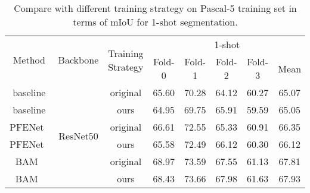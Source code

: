 \documentclass{article}
\begin{document}
\begin{table}[h]\scriptsize
\centering
\setlength\tabcolsep{4pt}
\renewcommand\arraystretch{1.3}
\caption{Compare with different training strategy on Pascal-5 training set in terms of mIoU for 1-shot segmentation.}
\label{tab:strategy}
\begin{tabular}{c|c|c|ccccc}
\hline
\multirow{2}{*}{Method} & \multirow{2}{*}{Backbone} & \multirow{2}{*}{Training Strategy} & \multicolumn{5}{c}{1-shot}                                    \\ \cline{4-8} 
                        &                           &                                    & Fold-0 & Fold-1 & Fold-2 & \multicolumn{1}{c|}{Fold-3} & Mean  \\ \hline
baseline                & \multirow{6}{*}{ResNet50} & original                           & 65.60  & 70.28  & 64.12  & \multicolumn{1}{c|}{60.27}  & 65.07 \\
baseline                &                           & ours                               & 64.95  & 69.75  & 65.91  & \multicolumn{1}{c|}{59.59}  & 65.05 \\ \cline{1-1} \cline{3-8} 
PFENet~\cite{tian2020prior}                  &                           & original                           & 66.61  & 72.55  & 65.33  & \multicolumn{1}{c|}{60.91}  & 66.35 \\
PFENet~\cite{tian2020prior}                  &                           & ours                               & 65.58  & 72.49  & 66.12  & \multicolumn{1}{c|}{60.30}  & 66.12 \\ \cline{1-1} \cline{3-8} 
BAM~\cite{lang2022learning}                     &                           & original                           & 68.97  & 73.59  & 67.55  & \multicolumn{1}{c|}{61.13}  & 67.81 \\
BAM~\cite{lang2022learning}                     &                           & ours                               & 68.43  & 73.66  & 67.98  & \multicolumn{1}{c|}{61.63}  & 67.93 \\ \hline
\end{tabular}
\end{table}
\end{document}
